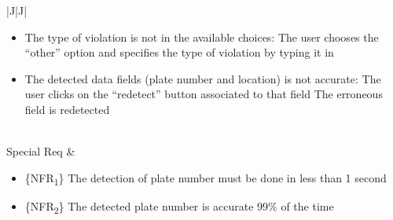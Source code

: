\begin{table}[!hbtp]
\begin{tabulary}{\textwidth}{|J|J|}
\begin{minipage}[t]{0.8\textwidth}
\begin{itemize}
\item The type of violation is not in the available choices: The user chooses the “other” option and specifies the type of violation by typing it in
\item The detected data fields (plate number and location) is not accurate: The user clicks on the “redetect” button associated to that field The erroneous field is redetected\\
\end{itemize}
\end{minipage}\\
\hline
Special Req     & 
\begin{minipage}[t]{0.8\textwidth}
\begin{itemize}
\item \{NFR\textsubscript{1}\} The detection of plate number must be done in less than 1 second
\item \{NFR\textsubscript{2}\} The detected plate number is accurate 99\% of the time
\end{itemize}
\end{minipage}\\
\hline
\end{tabulary}
\caption{\label{tab:xx}xx}
\end{table}


